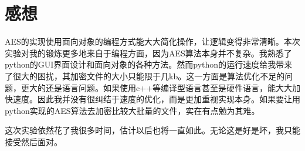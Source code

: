 \documentclass[11pt]{ctexart}
\begin{document}
\section{感想}
AES的实现使用面向对象的编程方式能大大简化操作，让逻辑变得非常清晰。本次实验对我的锻炼更多地来自于编程方面，因为AES算法本身并不复杂。我熟悉了python的GUI界面设计和面向对象的各种方法。然而python的运行速度给我带来了很大的困扰，其加密文件的大小只能限于几kb。这一方面是算法优化不足的问题，更大的还是语言问题。如果使用c++等编译型语言甚至是硬件语言，能大大加快速度。因此我并没有很纠结于速度的优化，而是更加重视实现本身。如果要让用python实现的AES算法去加密比较大批量的文件，实在有点勉为其难。

这次实验依然花了我很多时间，估计以后也将一直如此。无论这是好是坏，我只能接受然后面对。
\end{document}

